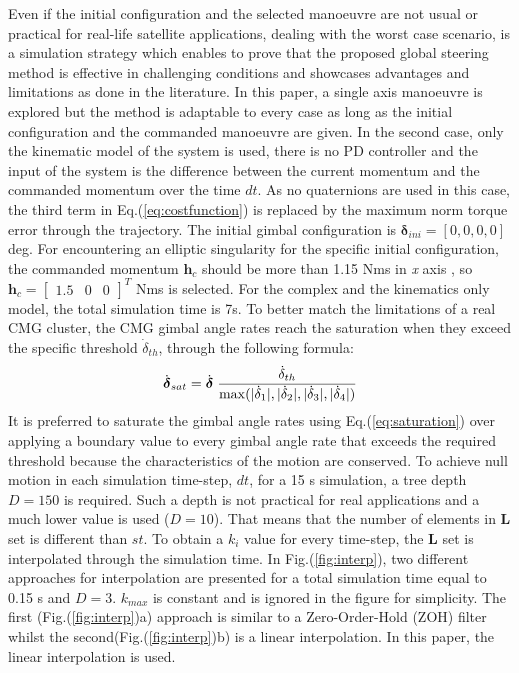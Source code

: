 \documentclass[journal]{new-aiaa}
\begin{document}
Even if the initial configuration and the selected manoeuvre are not usual or practical for real-life satellite applications, dealing with the worst case scenario, is a simulation strategy which enables to prove that the proposed global steering method is effective in challenging conditions and showcases advantages and limitations as done in the literature\cite{lappasthesis,vadali_preferred,bongwie2005}. In this paper, a single axis manoeuvre is explored but the method is adaptable to every case as long as the initial configuration and the commanded manoeuvre are given. In the second case, only the kinematic model of the system is used, there is no PD controller and the input of the system is the difference between the current momentum and the commanded momentum over the time  $dt$. As no quaternions are used in this case, the third term in Eq.(\ref{eq:costfunction}) is replaced by the maximum norm torque error through the trajectory. The initial gimbal configuration is  $\boldsymbol{\delta}_{ini}=[0, 0, 0, 0] $ deg. For encountering an elliptic singularity for the specific initial configuration, the commanded momentum $\textbf{h}_c$ should be more than 1.15 Nms in \textit{x} axis \cite{bedrossian_momentum}, so $\textbf{h}_c=\begin{bmatrix}1.5 & 0 & 0 \end{bmatrix}^T $ Nms is selected. 
For the complex and the kinematics only model, the total simulation time is 7s. To better match the limitations of a real CMG cluster, the CMG gimbal angle rates reach the saturation when they exceed the specific threshold $\dot{{\delta}}_{th}$, through the following formula:
\begin{equation}
\label{eq:saturation}
\dot{\boldsymbol{\delta}}_{sat}=\dot{\boldsymbol{\delta}}\hspace{0.1cm}\frac{\dot{{\delta}}_{th}}{\max(|\dot{\delta}_1|,|\dot{\delta}_2|,|\dot{\delta}_3|,|\dot{\delta}_4|)}
\end{equation}
It is preferred to saturate the gimbal angle rates using Eq.(\ref{eq:saturation}) over applying a boundary value to every gimbal angle rate that exceeds the required threshold because the characteristics of the motion are conserved. 
To achieve null motion in each simulation time-step, $dt$, for a 15 s simulation, a tree depth $D=150$ is required. Such a depth is not practical for real applications and a much lower value is used ($D=10$). That means that the number of elements in $\textbf{L}$ set is different than $st$.  To obtain a $k_i$ value for every time-step, the $\textbf{L}$ set is interpolated through the simulation time. In Fig.(\ref{fig:interp}), two different approaches for interpolation are presented for a total simulation time equal to 0.15 s and $D=3$. $k_{max}$ is constant and is ignored in the figure for simplicity. The first (Fig.(\ref{fig:interp})a) approach is similar to a Zero-Order-Hold (ZOH) filter whilst the second(Fig.(\ref{fig:interp})b) is a linear interpolation.  In this paper, the linear interpolation is used.
\end{document}
